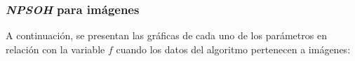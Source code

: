 \subsubsection{\emph{NPSOH} para imágenes}

	A continuación, se presentan las gráficas de cada uno de los
parámetros en relación con la variable $f$ cuando los datos del algoritmo
pertenecen a imágenes:

\begin{figure}[H]
  \centering
  \label{fig:f_pso1}
\end{figure}

